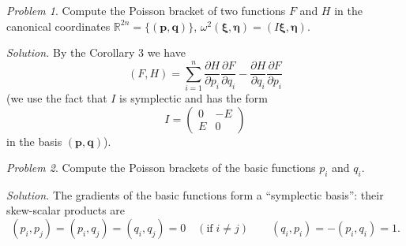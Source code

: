 \documentclass{book}
\numberwithin{equation}{section}
\theoremstyle{plain}
\theoremstyle{definition}
\theoremstyle{remark}
\theoremstyle{smallcap}
\newtheorem{prob}{Problem}
\numberwithin{prob}{section}
\newcommand{\solution}[1]{\textit{Solution.} #1}
\begin{document}
\begin{prob}
  Compute the Poisson bracket of two functions $F$ and $H$
  in the canonical coordinates
  $\mathbb R^{2n} = \{(\mathbf p, \mathbf q)\}$,
  $\omega^2(\pmb\xi, \pmb\eta) = (I\pmb\xi, \pmb\eta)$.

  \solution{
    By the Corollary 3 we have
    $$
    (F, H) =
    \sum_{i = 1}^n
      \frac{ \partial H } { \partial p_i } \frac{ \partial F } { \partial q_i }
      -
      \frac{ \partial H } { \partial q_i } \frac{ \partial F } { \partial p_i }
    $$
    (we use the fact that $I$ is symplectic and has the form
    $$
    I = \left(\begin{array}{ccc}
        0 & -E \\
        E & 0
    \end{array}\right)
    $$
    in the basis $(\mathbf p, \mathbf q)$).
  }
\end{prob}

\begin{prob}
  Compute the Poisson brackets of the basic functions $p_i$ and $q_i$.

  \solution{
    The gradients of the basic functions form a ``symplectic basis'':
    their skew-scalar products are
    $$
    (p_i, p_j) = (p_i, q_j) = (q_i, q_j) = 0 \quad (\mathrm{if}\; i\ne j)
    \qquad
    (q_i, p_i) = -(p_i, q_i) = 1.
    $$
  }
\end{prob}
\end{document}
